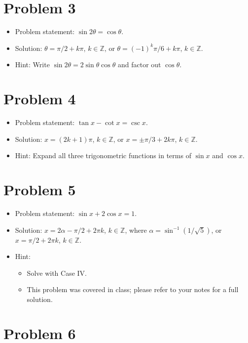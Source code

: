 \documentclass{amsart}
\begin{document}
\section*{Problem 3}

\begin{itemize}
  \item Problem statement: $\sin 2\theta = \cos \theta$.
  \item Solution: $\theta = \pi/2 + k \pi$, $k \in \mathbb{Z}$, or $\theta = (-1)^k \pi/6 + k \pi$, $k \in \mathbb{Z}$.
  \item Hint: Write $\sin 2\theta = 2\sin\theta \cos\theta$ and factor out $\cos\theta$.
  \end{itemize}  

  \section*{Problem 4}

\begin{itemize}
  \item Problem statement: $\tan x - \cot x = \csc x$.
  \item Solution: $x = (2k + 1)\pi$, $k \in \mathbb{Z}$, or $x = \pm \pi/3 + 2k\pi$, $k \in \mathbb{Z}$.
  \item Hint: Expand all three trigonometric functions in terms of $\sin x$ and $\cos x$.
  \end{itemize}  

  \section*{Problem 5}

\begin{itemize}
  \item Problem statement: $\sin x + 2 \cos x = 1$.
  \item Solution: $x = 2\alpha - \pi/2 + 2\pi k$, $k \in \mathbb{Z}$, where $\alpha = \sin^{-1}(1/\sqrt{5})$, or $x = \pi/2 + 2\pi k$, $k \in \mathbb{Z}$.
  \item Hint:
    \begin{itemize}
    \item Solve with Case IV.
    \item This problem was covered in class; please refer to your notes for a full solution.
    \end{itemize}
  \end{itemize}  


  \section*{Problem 6}
\end{document}

